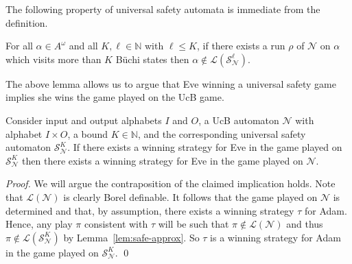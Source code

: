 \documentclass[runningheads,a4paper,draft]{llncs}
\newcommand{\eve}{Eve\xspace}
\newcommand{\adam}{Adam\xspace}
\newcommand{\calN}{\mathcal{N}}
\newcommand{\calS}{\mathcal{S}}
\newcommand{\lang}[1]{\mathcal{L}({#1})}
\begin{document}

The following property of universal safety automata is immediate from the
definition.
\begin{lemma}\label{lem:safe-approx}
  For all $\alpha \in A^\omega$ and all $K,\ell \in \mathbb{N}$ with $\ell
  \leq K$, if there exists a run $\rho$ of $\calN$ on $\alpha$ which visits
  more than $K$ B\"uchi states then $\alpha \not\in \lang{\calS^\ell_\calN}$.
\end{lemma}

The above lemma allows us to argue that \eve winning a universal safety game
implies she wins the game played on the UcB game.
\begin{lemma}
    Consider input and output alphabets $I$ and $O$, a UcB
    automaton $\calN$ with alphabet $I \times O$, a bound $K \in \mathbb{N}$,
    and the corresponding universal safety automaton $\calS^K_\calN$. If there
    exists a winning strategy for \eve in the game played on $\calS^K_\calN$
    then there exists a winning strategy for \eve in the game played on
    $\calN$.
\end{lemma}
\begin{proof}
    We will argue the contraposition of the claimed implication holds.
    Note that $\lang{\calN}$ is clearly Borel definable. It follows that the
    game played on $\calN$ is determined and that, by assumption, there exists a
    winning strategy $\tau$ for \adam. Hence, any play $\pi$ consistent with
    $\tau$ will be such that $\pi \not\in \lang{\calN}$ and thus $\pi \not\in
    \lang{\calS^K_\calN}$ by Lemma~\ref{lem:safe-approx}.
    So $\tau$ is a winning strategy for \adam in the game
    played on $\calS^K_\calN$.
\qed\end{proof}
\end{document}
